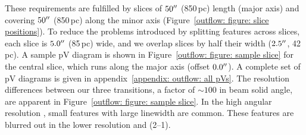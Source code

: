 These requirements are fulfilled by slices of $50^{\prime\prime}$ (850\,pc) length (major axis) and covering $50^{\prime\prime}$ (850\,pc) along the minor axis (Figure~\ref{outflow: figure: slice positions}). To reduce the problems introduced by splitting features across slices, each slice is $5.0^{\prime\prime}$ (85\,pc) wide, and we overlap slices by half their width ($2.5^{\prime\prime}$, 42\,pc). A sample pV diagram is shown in Figure~\ref{outflow: figure: sample slice} for the central slice, which runs along the major axis (offset $0.0^{\prime\prime}$). A complete set of pV diagrams is given in appendix~\ref{appendix: outflow: all pVs}. The resolution differences between our three transitions, a factor of $\sim 100$ in beam solid angle, are apparent in Figure~\ref{outflow: figure: sample slice}. In the high angular resolution , small features with large linewidth are common. These features are blurred out in the lower resolution  and (2--1).

